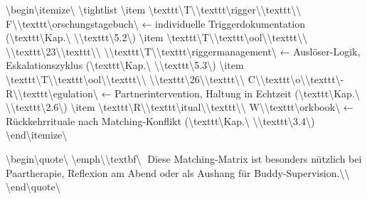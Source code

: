 \textbackslash{}begin\textbackslash{}{itemize\textbackslash{}}
\textbackslash{}tightlist
\textbackslash{}item
  \textbackslash{}texttt\textbackslash{}{T\textbackslash{}}\textbackslash{}texttt\textbackslash{}{rigger\textbackslash{}}\textbackslash{}texttt\textbackslash{}{\textbackslash{} F\textbackslash{}}\textbackslash{}texttt\textbackslash{}{orschungstagebuch\textbackslash{}} ← individuelle Triggerdokumentation (\textbackslash{}texttt\textbackslash{}{Kap.\textbackslash{} \textbackslash{}}\textbackslash{}texttt\textbackslash{}{5.2\textbackslash{}})
\textbackslash{}item
  \textbackslash{}texttt\textbackslash{}{T\textbackslash{}}\textbackslash{}texttt\textbackslash{}{ool\textbackslash{}}\textbackslash{}texttt\textbackslash{}{\textbackslash{} \textbackslash{}}\textbackslash{}texttt\textbackslash{}{23\textbackslash{}}\textbackslash{}texttt\textbackslash{}{\textbackslash{} \textbackslash{}}\textbackslash{}texttt\textbackslash{}{T\textbackslash{}}\textbackslash{}texttt\textbackslash{}{riggermanagement\textbackslash{}} ← Auslöser-Logik, Eskalationszyklus (\textbackslash{}texttt\textbackslash{}{Kap.\textbackslash{} \textbackslash{}}\textbackslash{}texttt\textbackslash{}{5.3\textbackslash{}})
\textbackslash{}item
  \textbackslash{}texttt\textbackslash{}{T\textbackslash{}}\textbackslash{}texttt\textbackslash{}{ool\textbackslash{}}\textbackslash{}texttt\textbackslash{}{\textbackslash{} \textbackslash{}}\textbackslash{}texttt\textbackslash{}{26\textbackslash{}}\textbackslash{}texttt\textbackslash{}{\textbackslash{} C\textbackslash{}}\textbackslash{}texttt\textbackslash{}{o\textbackslash{}}\textbackslash{}texttt\textbackslash{}{-R\textbackslash{}}\textbackslash{}texttt\textbackslash{}{egulation\textbackslash{}} ← Partnerintervention, Haltung in Echtzeit (\textbackslash{}texttt\textbackslash{}{Kap.\textbackslash{} \textbackslash{}}\textbackslash{}texttt\textbackslash{}{2.6\textbackslash{}})
\textbackslash{}item
  \textbackslash{}texttt\textbackslash{}{R\textbackslash{}}\textbackslash{}texttt\textbackslash{}{itual\textbackslash{}}\textbackslash{}texttt\textbackslash{}{\textbackslash{} W\textbackslash{}}\textbackslash{}texttt\textbackslash{}{orkbook\textbackslash{}} ← Rückkehrrituale nach Matching-Konflikt (\textbackslash{}texttt\textbackslash{}{Kap.\textbackslash{} \textbackslash{}}\textbackslash{}texttt\textbackslash{}{3.4\textbackslash{}})
\textbackslash{}end\textbackslash{}{itemize\textbackslash{}}

\textbackslash{}begin\textbackslash{}{quote\textbackslash{}}
\textbackslash{}emph\textbackslash{}{\textbackslash{}textbf\textbackslash{}{📎 Diese Matching-Matrix ist besonders nützlich bei Paartherapie, Reflexion am Abend oder als Aushang für Buddy-Supervision.\textbackslash{}}\textbackslash{}}
\textbackslash{}end\textbackslash{}{quote\textbackslash{}}

